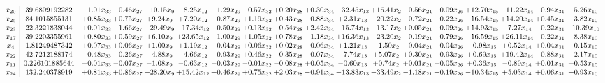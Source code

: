 \documentclass[9pt]{article}
\begin{document}
 \[\begin{array}{c| c c@{\hskip 2pt} c@{\hskip 2pt} c@{\hskip 2pt} c@{\hskip 2pt} c@{\hskip 2pt} c@{\hskip 2pt} c@{\hskip 2pt} c@{\hskip 2pt} c@{\hskip 2pt} c@{\hskip 2pt} c@{\hskip 2pt} c@{\hskip 2pt} c@{\hskip 2pt} c@{\hskip 2pt} c@{\hskip 2pt} c@{\hskip 2pt} }
 x_{20}   &  39.6809192282 & -1.01 x_{33} & -0.46 x_{27} & + 10.15 x_{9} & -8.25 x_{12} & -1.29 x_{29} & -0.57 x_{32} & +  0.20 x_{28} & +  0.30 x_{34} & -32.45 x_{13} & + 16.41 x_{2} & -0.56 x_{21} & -0.09 x_{26} & + 12.70 x_{15} & -11.22 x_{14} & -0.94 x_{31} & +  5.26 x_{10}\\
 x_{25}   &  84.1015855131 & +  0.85 x_{33} & +  0.75 x_{27} & +  9.24 x_{9} & +  7.20 x_{12} & +  0.87 x_{29} & +  1.19 x_{32} & +  0.43 x_{28} & -0.88 x_{34} & +  2.31 x_{13} & -20.22 x_{2} & -0.72 x_{21} & -0.22 x_{26} & -16.54 x_{15} & + 14.20 x_{14} & +  0.45 x_{31} & +  3.82 x_{10}\\
 x_{23}   &  22.3221838044 & +  0.01 x_{33} & -1.66 x_{27} & -29.49 x_{9} & -17.34 x_{12} & +  0.50 x_{29} & +  0.13 x_{32} & -0.54 x_{28} & +  2.42 x_{34} & -15.74 x_{13} & -13.17 x_{2} & +  0.05 x_{21} & -0.09 x_{26} & + 14.93 x_{15} & -7.27 x_{14} & -0.22 x_{31} & -10.39 x_{10}\\
 x_{17}   &  39.2203355961 & +  0.80 x_{33} & +  0.59 x_{27} & +  6.10 x_{9} & + 23.65 x_{12} & +  1.00 x_{29} & +  1.05 x_{32} & +  0.78 x_{28} & -1.18 x_{34} & + 16.36 x_{13} & -23.20 x_{2} & -0.19 x_{21} & +  0.79 x_{26} & -16.59 x_{15} & + 26.11 x_{14} & -0.22 x_{31} & +  8.38 x_{10}\\
 x_{4}   &  1.81249487342 & +  0.07 x_{33} & +  0.06 x_{27} & +  1.00 x_{9} & +  1.19 x_{12} & +  0.04 x_{29} & +  0.06 x_{32} & +  0.02 x_{28} & -0.06 x_{34} & +  1.21 x_{13} & -1.50 x_{2} & -0.04 x_{21} & -0.04 x_{26} & -0.98 x_{15} & +  0.52 x_{14} & +  0.04 x_{31} & -0.15 x_{10}\\
 x_{22}   &  42.7212188174 & -0.48 x_{33} & -0.26 x_{27} & -4.88 x_{9} & -4.66 x_{12} & +  0.93 x_{29} & +  0.46 x_{32} & -0.35 x_{28} & -0.07 x_{34} & -7.74 x_{13} & +  5.07 x_{2} & +  0.30 x_{21} & +  0.93 x_{26} & +  0.69 x_{15} & + 19.42 x_{14} & -0.88 x_{31} & +  2.17 x_{10}\\
 x_{11}   &  0.226101885644 & -0.01 x_{33} & -0.07 x_{27} & -1.08 x_{9} & -0.63 x_{12} & -0.03 x_{29} & -0.01 x_{32} & -0.08 x_{28} & +  0.05 x_{34} & -0.60 x_{13} & +  0.74 x_{2} & +  0.01 x_{21} & -0.05 x_{26} & +  0.36 x_{15} & -0.89 x_{14} & +  0.01 x_{31} & +  0.53 x_{10}\\
 x_{24}   &  132.240378919 & +  0.81 x_{33} & +  0.86 x_{27} & + 28.20 x_{9} & + 15.42 x_{12} & +  0.46 x_{29} & +  0.75 x_{32} & +  2.03 x_{28} & -0.91 x_{34} & -13.83 x_{13} & -33.49 x_{2} & -1.18 x_{21} & +  0.19 x_{26} & -10.34 x_{15} & +  5.03 x_{14} & +  0.06 x_{31} & +  0.93 x_{10}\\

\end{array}\]
\end{document}
